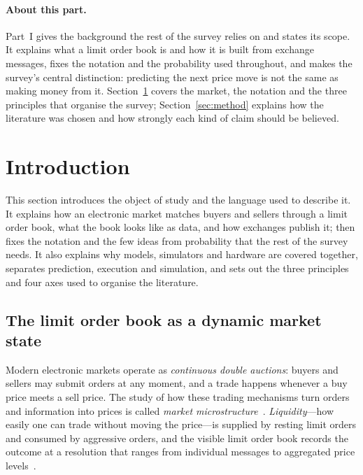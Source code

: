 \paragraph{About this part.} Part~I gives the background the rest of the survey relies on and states its
scope. It explains what a
limit order book is and how it is built from exchange messages, fixes the notation and the probability
used throughout, and makes the survey's central distinction: predicting the next price move is not the
same as making money from it. Section~\ref{sec:intro} covers the market, the notation and the three
principles that organise the survey; Section~\ref{sec:method} explains how the literature was chosen
and how strongly each kind of claim should be believed.

\section{Introduction}
\label{sec:intro}

This section introduces the object of study and the language used to describe it. It explains how an
electronic market matches buyers and sellers through a limit order book, what the book looks like as
data, and how exchanges publish it; then fixes the notation and the few ideas from probability that
the rest of the survey needs. It also explains why models, simulators and hardware are covered together, separates prediction, execution and
simulation, and sets out the three principles and four axes used to organise the literature.

\subsection{The limit order book as a dynamic market state}

Modern electronic markets operate as \emph{continuous double auctions}: buyers and sellers may
submit orders at any moment, and a trade happens whenever a buy price meets a sell price. The study
of how these trading mechanisms turn orders and information into prices is called \emph{market
microstructure}~\citep{ohara1995,harris2003,hasbrouck2007}. \emph{Liquidity}---how easily one can
trade without moving the price---is supplied by resting limit orders and consumed by aggressive
orders, and the visible limit order book records the outcome at a resolution that ranges from
individual messages to aggregated price levels~\citep{gould2013,bouchaud2018}.

